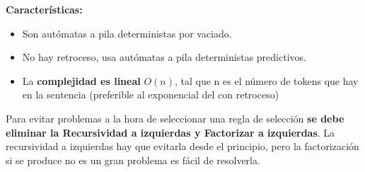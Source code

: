 \documentclass[12pt, twoside, openright]{report} %
\begin{document}
\textbf{Características:}

\begin{itemize}
	\item Son autómatas a pila deterministas por vaciado.
	\item No hay retroceso, usa autómatas a pila deterministas predictivos.
	\item La \textbf{complejidad es lineal} \(O(n)\), tal que n es el número de
	      tokens que hay en la sentencia (preferible al exponencial del con
	      retroceso)
\end{itemize}

Para evitar problemas a la hora de seleccionar una regla de selección
\textbf{se debe eliminar la Recursividad a izquierdas y Factorizar a
	izquierdas}. La recursividad a izquierdas hay que evitarla desde el
principio, pero la factorización si se produce no es un gran problema es
fácil de resolverla.
\end{document}
